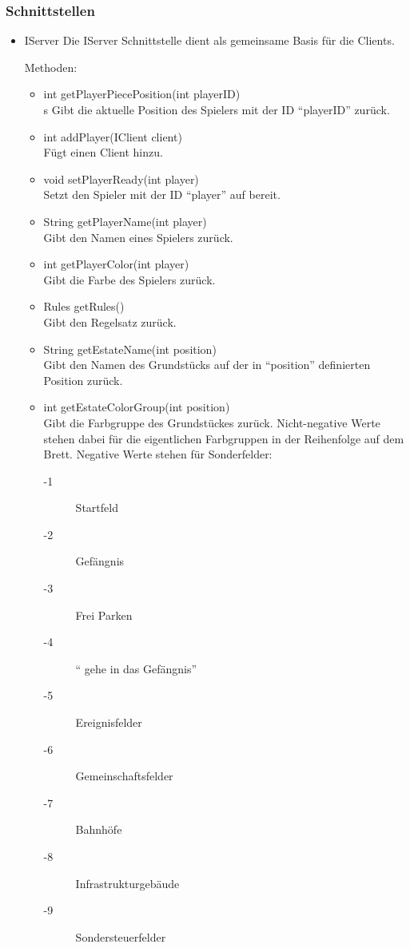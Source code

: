 \documentclass[a4paper,10pt]{article}
\begin{document}
\subsubsection{Schnittstellen}
\begin{itemize}
\item IServer
Die IServer Schnittstelle dient als gemeinsame Basis für die Clients.

Methoden:
\begin{itemize}
\item int getPlayerPiecePosition(int playerID) \\s
Gibt die aktuelle Position des Spielers mit der ID "`playerID"' zurück.
\item int addPlayer(IClient client) \\
Fügt einen Client hinzu.
\item void setPlayerReady(int player) \\
Setzt den Spieler mit der ID "`player"' auf bereit.
\item String getPlayerName(int player) \\
Gibt den Namen eines Spielers zurück.
\item int getPlayerColor(int player) \\
Gibt die Farbe des Spielers zurück.
\item Rules getRules() \\
Gibt den Regelsatz zurück.
\item String getEstateName(int position) \\
Gibt den Namen des Grundstücks auf der in "`position"' definierten Position zurück.
\item int getEstateColorGroup(int position) \\
Gibt die Farbgruppe des Grundstückes zurück. Nicht-negative Werte stehen dabei für die eigentlichen Farbgruppen in der Reihenfolge auf dem Brett. Negative Werte stehen für Sonderfelder:
\begin{description}
\item[-1] Startfeld
\item[-2] Gefängnis
\item[-3] Frei Parken
\item[-4] "` gehe in das Gefängnis"'
\item[-5] Ereignisfelder
\item[-6] Gemeinschaftsfelder
\item[-7] Bahnhöfe
\item[-8] Infrastrukturgebäude
\item[-9] Sondersteuerfelder

\end{description}
\end{itemize}
\end{itemize}
\end{document}
